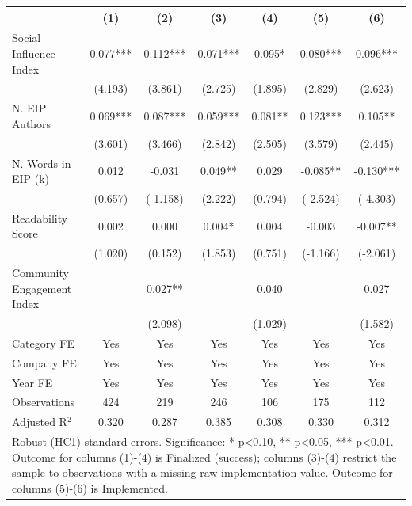 \begin{tabular}{lcccccc}
\toprule
 & (1) & (2) & (3) & (4) & (5) & (6) \\
\midrule
Social Influence Index & 0.077*** & 0.112*** & 0.071*** & 0.095* & 0.080*** & 0.096*** \\
 & (4.193) & (3.861) & (2.725) & (1.895) & (2.829) & (2.623) \\
N. EIP Authors & 0.069*** & 0.087*** & 0.059*** & 0.081** & 0.123*** & 0.105** \\
 & (3.601) & (3.466) & (2.842) & (2.505) & (3.579) & (2.445) \\
N. Words in EIP (k) & 0.012 & -0.031 & 0.049** & 0.029 & -0.085** & -0.130*** \\
 & (0.657) & (-1.158) & (2.222) & (0.794) & (-2.524) & (-4.303) \\
Readability Score & 0.002 & 0.000 & 0.004* & 0.004 & -0.003 & -0.007** \\
 & (1.020) & (0.152) & (1.853) & (0.751) & (-1.166) & (-2.061) \\
Community Engagement Index &  & 0.027** &  & 0.040 &  & 0.027 \\
 &  & (2.098) &  & (1.029) &  & (1.582) \\
\midrule
Category FE & Yes & Yes & Yes & Yes & Yes & Yes \\
Company FE & Yes & Yes & Yes & Yes & Yes & Yes \\
Year FE & Yes & Yes & Yes & Yes & Yes & Yes \\
\midrule
Observations & 424 & 219 & 246 & 106 & 175 & 112 \\
Adjusted R$^2$ & 0.320 & 0.287 & 0.385 & 0.308 & 0.330 & 0.312 \\
\bottomrule
\multicolumn{7}{l}{\footnotesize Robust (HC1) standard errors. Significance: * p<0.10, ** p<0.05, *** p<0.01. Outcome for columns (1)-(4) is Finalized (success); columns (3)-(4) restrict the sample to observations with a missing raw implementation value. Outcome for columns (5)-(6) is Implemented.} \\
\end{tabular}
